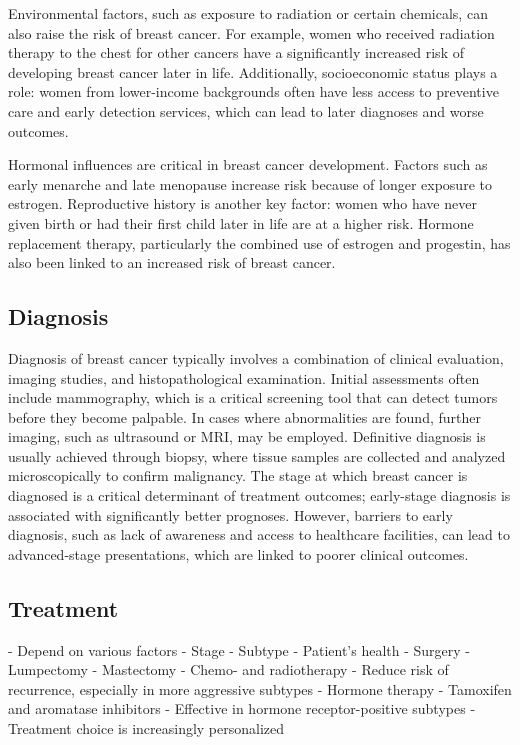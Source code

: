 Environmental factors, such as exposure to radiation or certain chemicals, can
also raise the risk of breast cancer. For example, women who received radiation
therapy to the chest for other cancers have a significantly increased risk of
developing breast cancer later in life\supercite{froes_brandao_prolactin_2016}.
Additionally, socioeconomic status plays a role: women from lower-income
backgrounds often have less access to preventive care and early detection
services, which can lead to later diagnoses and worse
outcomes\supercite{cunningham_mind_2013}.

Hormonal influences are critical in breast cancer development. Factors such as
early menarche and late menopause increase risk because of longer exposure to
estrogen\supercite{nounu_sex_2022}. Reproductive history is another key factor:
women who have never given birth or had their first child later in life are at a
higher risk\supercite{claudia_admoun_etiology_2022}. Hormone replacement
therapy, particularly the combined use of estrogen and progestin, has also been
linked to an increased risk of breast cancer\supercite{turner_meta-analysis_2011}.

\subsection{Diagnosis}

Diagnosis of breast cancer typically involves a combination of clinical
evaluation, imaging studies, and histopathological examination. Initial
assessments often include mammography, which is a critical screening tool that
can detect tumors before they become palpable\supercite{hameed_breast_2020}. In
cases where abnormalities are found, further imaging, such as ultrasound or MRI,
may be employed. Definitive diagnosis is usually achieved through biopsy, where
tissue samples are collected and analyzed microscopically to confirm
malignancy\supercite{hameed_breast_2020}. The stage at which breast cancer is
diagnosed is a critical determinant of treatment outcomes; early-stage diagnosis
is associated with significantly better
prognoses\supercite{getachew_perceived_2020}. However, barriers to early
diagnosis, such as lack of awareness and access to healthcare facilities, can
lead to advanced-stage presentations, which are linked to poorer clinical
outcomes\supercite{getachew_perceived_2020,dickens_stage_2014}.

\subsection{Treatment}

- Depend on various factors
    - Stage
    - Subtype
    - Patient's health
- Surgery
    - Lumpectomy
    - Mastectomy
- Chemo- and radiotherapy
    - Reduce risk of recurrence, especially in more aggressive subtypes
- Hormone therapy
    - Tamoxifen and aromatase inhibitors
    - Effective in hormone receptor-positive subtypes
- Treatment choice is increasingly personalized
